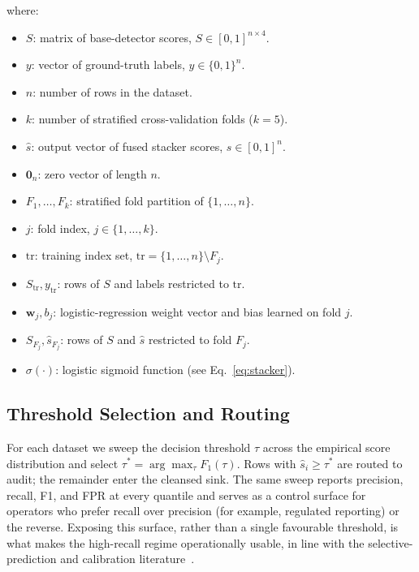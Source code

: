 \documentclass{ieeeaccess}
\begin{document}
\noindent where:
\begin{itemize}\setlength{\itemsep}{0pt}\setlength{\parskip}{0pt}
\item $S$: matrix of base-detector scores, $S\in[0,1]^{n\times 4}$.
\item $y$: vector of ground-truth labels, $y\in\{0,1\}^{n}$.
\item $n$: number of rows in the dataset.
\item $k$: number of stratified cross-validation folds ($k=5$).
\item $\hat{s}$: output vector of fused stacker scores, $\hat{s}\in[0,1]^{n}$.
\item $\mathbf{0}_n$: zero vector of length $n$.
\item $F_1,\dots,F_k$: stratified fold partition of $\{1,\dots,n\}$.
\item $j$: fold index, $j\in\{1,\dots,k\}$.
\item $\mathrm{tr}$: training index set, $\mathrm{tr}=\{1,\dots,n\}\setminus F_j$.
\item $S_{\mathrm{tr}}, y_{\mathrm{tr}}$: rows of $S$ and labels restricted to $\mathrm{tr}$.
\item $\mathbf{w}_j, b_j$: logistic-regression weight vector and bias learned on fold $j$.
\item $S_{F_j}, \hat{s}_{F_j}$: rows of $S$ and $\hat{s}$ restricted to fold $F_j$.
\item $\sigma(\cdot)$: logistic sigmoid function (see Eq.~\eqref{eq:stacker}).
\end{itemize}

\subsection{Threshold Selection and Routing}

For each dataset we sweep the decision threshold $\tau$ across the empirical score
distribution and select $\tau^{*} = \arg\max_{\tau} F_1(\tau)$. Rows with
$\hat{s}_i \geq \tau^{*}$ are routed to audit; the remainder enter the cleansed
sink. The same sweep reports precision, recall, F1, and FPR at every quantile and
serves as a control surface for operators who prefer recall over precision (for
example, regulated reporting) or the reverse. Exposing this surface, rather than a
single favourable threshold, is what makes the high-recall regime operationally
usable, in line with the selective-prediction and
calibration literature~\cite{geifman2017selective, guo2017calibration}.
\end{document}
